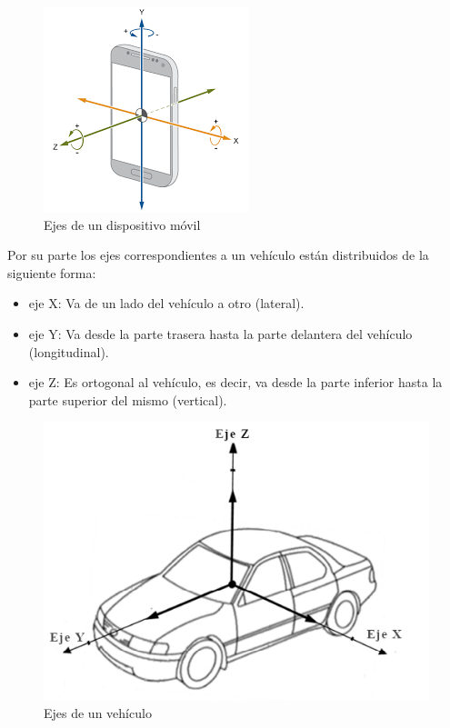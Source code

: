 	\begin{figure}[htb]
		\centering
		\includegraphics[scale = 0.5]{Graphics/mobile_phone_axis.png}
		\caption{Ejes de un dispositivo móvil}
		\label{fig:2}
	\end{figure}

	Por su parte los ejes correspondientes a un vehículo están distribuidos de la siguiente forma:

	\begin{itemize}
		\item eje X: Va de un lado del vehículo a otro (lateral).
		\item eje Y: Va desde la parte trasera hasta la parte delantera del vehículo (longitudinal).
		\item eje Z: Es ortogonal al vehículo, es decir, va desde la parte inferior hasta la parte superior del mismo (vertical).
	\end{itemize}

	\begin{figure}[htb]
		\centering
		\includegraphics[scale = 0.4]{Graphics/car-axis.jpg}
		\caption{Ejes de un vehículo}
		\label{fig:3}
	\end{figure}

